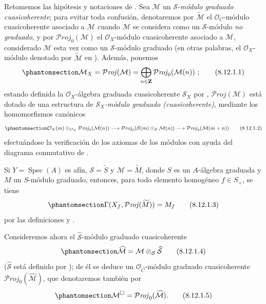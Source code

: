 \documentclass[oneside,10pt]{amsart}
\makeatletter
\newcommand{\ega@arrow}[2]{\mathchoice{#1}{#2}{#2}{#2}}
\renewcommand{\to}{\ega@arrow{\longrightarrow}{\rightarrow}}
\newcommand{\oldpage}[2][]{\marginnote{\normalfont\footnotesize\textbf{#1}~|~#2}\ignorespaces}
\let\EGAOriginalLabel\label
\renewcommand{\label}[1]{\phantomsection\EGAOriginalLabel{#1}}
\makeatother
\begin{document}
\begin{env}[8.12.1]
\label{II.8.12.1-fr}
Retomemos las hipótesis y notaciones de .
Sea $\mathcal{M}$ un \emph{$\mathcal{S}$-módulo graduado cuasicoherente}; para evitar toda confusión, denotaremos por $\widetilde{\mathcal{M}}$ el $\mathcal{O}_C$-módulo cuasicoherente
\oldpage[II]{192}
asociado a $\mathcal{M}$  cuando $\mathcal{M}$ se considera como un $\mathcal{S}$-módulo \emph{no graduado}, y por $\mathcal{P}\mathit{roj}_0(\mathcal{M})$ el $\mathcal{O}_X$-módulo cuasicoherente asociado a $\mathcal{M}$, considerado $\mathcal{M}$ esta vez como un $\mathcal{S}$-módulo graduado (en otras palabras, el $\mathcal{O}_X$-módulo denotado por $\widetilde{\mathcal{M}}$ en ).
Además, ponemos
\begin{equation}
\label{II.8.12.1.1-fr}
  \mathcal{M}_X=\mathcal{P}\mathit{roj}(\mathcal{M})
  =\bigoplus_{n\in\mathbf{Z}}\mathcal{P}\mathit{roj}_0(\mathcal{M}(n))~;
\tag{8.12.1.1}
\end{equation}
estando definida la $\mathcal{O}_X$-álgebra graduada cuasicoherente $\mathcal{S}_X$ por , $\mathcal{P}\mathit{roj}(\mathcal{M})$ está dotado de una estructura de \emph{$\mathcal{S}_X$-módulo graduado (cuasicoherente)}, mediante los homomorfismos canónicos 
\begin{equation}
\label{II.8.12.1.2-fr}
  \mathcal{O}_X(m)\otimes_{\mathcal{O}_X}
  \mathcal{P}\mathit{roj}_0(\mathcal{M}(n))
  \to \mathcal{P}\mathit{roj}_0(\mathcal{S}(m)\otimes_{\mathcal{S}}\mathcal{M}(n))
  \to \mathcal{P}\mathit{roj}_0(\mathcal{M}(m+n))
\tag{8.12.1.2}
\end{equation}
efectuándose la verificación de los axiomas de los módulos con ayuda del diagrama conmutativo de .

Si $Y=\operatorname{Spec}(A)$ es afín, $\mathcal{S}=\widetilde{S}$ y $\mathcal{M}=\widetilde{M}$, donde $S$ es un $A$-álgebra graduada y $M$ un $S$-módulo graduado, entonces, para todo elemento homogéneo $f\in S_+$, se tiene
\begin{equation}
\label{II.8.12.1.3-fr}
  \Gamma(X_f,\mathcal{P}\mathit{roj}(\widetilde{M}))=M_f
\tag{8.12.1.3}
\end{equation}
por las definiciones y .

Consideremos ahora el $\widehat{\mathcal{S}}$-módulo graduado cuasicoherente
\begin{equation}
\label{II.8.12.1.4-fr}
  \widehat{\mathcal{M}}
  =\mathcal{M}\otimes_{\mathcal{S}}\widehat{\mathcal{S}}
\tag{8.12.1.4}
\end{equation}
($\widehat{\mathcal{S}}$ está definido por ); de él se deduce un $\mathcal{O}_{\widehat{C}}$-módulo graduado cuasicoherente $\mathcal{P}\mathit{roj}_0(\widehat{\mathcal{M}})$, que denotaremos también por
\begin{equation}
\label{II.8.12.1.5-fr}
  \mathcal{M}^{\square}=\mathcal{P}\mathit{roj}_0(\widehat{\mathcal{M}}).
\tag{8.12.1.5}
\end{equation}


\end{env}
\end{document}
